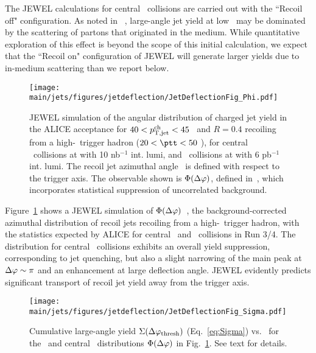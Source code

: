 The JEWEL calculations for central \PbPb\ collisions are carried out with the ``Recoil off" configuration. As noted in ~\cite{DEramo:2018eoy}, large-angle jet yield at low \ptjet\ may be dominated by the scattering of partons that originated in the medium. While quantitative exploration of this effect is beyond the scope of this initial calculation, we expect that the ``Recoil on" configuration of JEWEL will generate larger yields due to in-medium scattering than we report below.

\begin{figure}[tbh!]
\centering
\texttt{[image: \\main/jets/figures/jetdeflection/JetDeflectionFig\_Phi.pdf]}
\caption{JEWEL simulation of the angular distribution of charged jet yield in the ALICE acceptance for  $40<p_{\mathrm{T,jet}}^{\mathrm{ch}}<45$ \gevc\ and $R=0.4$ recoiling from a high-\pt\ trigger hadron ($20<\ptt<50$ \gevc), for central \PbPb\ collisions at  with 10 nb$^{-1}$ int. lumi, and \pp\ collisions at  with 6 pb$^{-1}$ int. lumi. The recoil jet azimuthal angle \Dphi\ is defined with respect to the trigger axis. The observable shown is $\Phi(\Delta\varphi)$, defined in~\cite{Adam:2015doa}, which incorporates statistical suppression of uncorrelated background.
}
\label{fig:JetDeflectionPhi}
\end{figure}

Figure~\ref{fig:JetDeflectionPhi} shows a JEWEL simulation of $\Phi(\Delta\varphi)$~\cite{Adam:2015doa}, the background-corrected azimuthal distribution of recoil jets recoiling from a high-\pT\ trigger hadron, with the statistics expected by ALICE for central \PbPb\ and \pp\ collisions in Run 3/4. The distribution for central \PbPb\ collisions exhibits an overall yield suppression, corresponding to jet quenching, but also a slight narrowing of the main peak at $\Delta\varphi\sim\pi$ and an enhancement at large deflection angle. JEWEL evidently predicts significant transport of recoil jet yield away from the trigger axis.

\begin{figure}[tbh!]
\centering
\texttt{[image: \\main/jets/figures/jetdeflection/JetDeflectionFig\_Sigma.pdf]}
\caption{Cumulative large-angle yield $\Sigma(\Delta\varphi_{\mathrm{thresh}})$ (Eq.~\ref{eq:Sigma}) vs. \dphithresh\ for the \pp\ and central \PbPb\ distributions $\Phi(\Delta\varphi)$ in Fig.~\ref{fig:JetDeflectionPhi}. See text for details. 
}
\label{fig:JetDeflectionSigma}
\end{figure}

